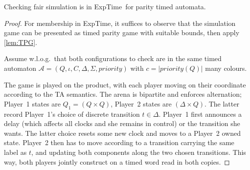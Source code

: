 \documentclass[10pt,a4paper]{amsart}
\theoremstyle{definition}
\numberwithin{equation}{section}
\newcommand{\x}{\times}
\newcommand{\card}[1]{|#1|}
\newcommand{\auta}{\mathcal{A}}
\newcommand{\states}{Q}
\newcommand{\transitions}{\Delta}
\newcommand{\clocks}{C}
\newcommand{\priority}{\mathit{priority}}
\newcommand{\EXPTIME}{{\sc ExpTime}}
\begin{document}
\begin{theorem}
    \label{lem:GFGTA:fairsim-ub}
    \label{lem:GFGTA:fairsim}
    Checking fair simulation is in \EXPTIME\ for parity timed automata.
\end{theorem}
\begin{proof}
For membership in \EXPTIME, it suffices to observe that the simulation game can be presented as timed parity game with suitable bounds, then apply \cref{lem:TPG}.

Assume w.l.o.g.\ that both configurations to check are in the same timed automaton
$\auta = (\states,\iota,\clocks,\transitions,\Sigma,\priority)$ with $c=\card{\priority(Q)}$ many colours.

The game is played on the product, with each player moving on their coordinate according to the TA semantics.
The arena is bipartite and enforces alternation; Player~1 states are $Q_1=(Q\x Q)$, Player~2 states are $(\transitions\x Q)$.
The latter record Player~1's choice of discrete transition $t\in\transitions$.
Player~1 first announces a delay (which affects all clocks and she remains in control) or the transition she wants.
The latter choice resets some new clock and moves to a Player~2 owned state. 
Player~2 then has to move according to a transition carrying the same label as $t$,
and updating both components along the two chosen transitions.
This way, both players jointly construct on a timed word read in both copies.


\end{proof}
\end{document}
